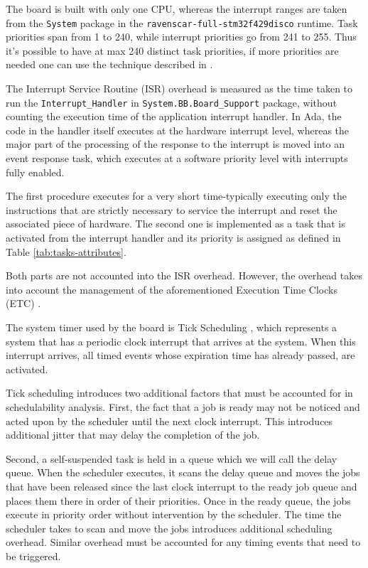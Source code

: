 \documentclass{article}
\begin{document}
The board is built with only one CPU, whereas the interrupt ranges are taken from the \texttt{System} package in the \texttt{ravenscar-full-stm32f429disco} runtime. Task priorities span from 1 to 240, while interrupt priorities go from 241 to 255. Thus it's possible to have at max 240 distinct task priorities, if more priorities are needed one can use the technique described in \cite{limited-priorities}.

The Interrupt Service Routine (ISR) overhead is measured as the time taken to run the \texttt{Interrupt\_Handler} in \texttt{System.BB.Board\_Support} package, without counting the execution time of the application interrupt handler. In Ada, the code in the handler itself executes at the hardware interrupt level, whereas the major part of the processing of the response to the interrupt is moved into an event response task, which executes at a software priority level with interrupts fully enabled.

The first procedure executes for a very short time-typically executing only the instructions that are strictly necessary to service the interrupt and reset the associated piece of hardware. The second one is implemented as a task that is activated from the interrupt handler and its priority is assigned as defined in Table \ref{tab:tasks-attributes}.

Both parts are not accounted into the ISR overhead. However, the overhead takes into account the management of the aforementioned Execution Time Clocks (ETC) \cite{etc}.

The system timer used by the board is Tick Scheduling \cite{tick-scheduling}, which represents a system that has a periodic clock interrupt that arrives at the system. When this interrupt arrives, all timed events whose expiration time has already passed, are activated.

Tick scheduling introduces two additional factors that must be accounted for in schedulability analysis. First, the fact that a job is ready may not be noticed and acted upon by the scheduler until the next clock interrupt. This introduces additional jitter that may delay the completion of the job.

Second, a self-suspended task is held in a queue which we will call the delay queue. When the scheduler executes, it scans the delay queue and moves the jobs that have been released since the last clock interrupt to the ready job queue and places them there in order of their priorities. Once in the ready queue, the jobs execute in priority order without intervention by the scheduler. The time the scheduler takes to scan and move the jobs introduces additional scheduling overhead. Similar overhead must be accounted for any timing events that need to be triggered.
\end{document}

